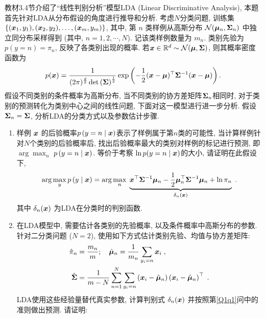 \documentclass[answers]{exam}  %
\begin{document}
\begin{questions}
  教材3.4节介绍了“线性判别分析”模型LDA (Linear Discriminative Analysis), 本题首先针对LDA从分布假设的角度进行推导和分析.
  考虑$N$分类问题, 训练集 $\left\{({\boldsymbol{x}}_1,y_1),({\boldsymbol{x}}_2,y_2),\ldots,({\boldsymbol{x}}_m,y_m)\right\}$, 其中, 第 $n$ 类样例从高斯分布 $\mathcal{N}(\boldsymbol{\mu}_n,\boldsymbol{\Sigma}_n)$ 中独立同分布采样得到 (其中, $n=1,2,\cdots,N$). 记该类样例数量为 $m_n$. 类别先验为 $p\left(y=n\right)=\pi_n$, 反映了各类别出现的概率. 若${\boldsymbol{x}}\in \mathbb{R}^d \sim \mathcal{N}(\boldsymbol{\mu},\boldsymbol{\Sigma})$, 则其概率密度函数为
  \begin{align}
    p({\boldsymbol{x}})=\frac{1}{(2\pi)^{\frac{d}{2}}\det\left(\boldsymbol{\Sigma}\right)^\frac{1}{2}}\exp\left(-\frac{1}{2}({\boldsymbol{x}}-\boldsymbol{\mu})^\top\boldsymbol{\Sigma}^{-1}({\boldsymbol{x}}-\boldsymbol{\mu})\right).
  \end{align}
  假设不同类别的条件概率为高斯分布, 当不同类别的协方差矩阵$\boldsymbol{\Sigma}_n$相同时, 对于类别的预测转化为类别中心之间的线性问题, %
  下面对这一模型进行进一步分析.
  假设$\boldsymbol{\Sigma}_n = \boldsymbol{\Sigma}$, 分析LDA的分类方式以及参数估计步骤.
  \begin{enumerate}
    \item \label{Q1q1}样例 ${\boldsymbol{x}}$ 的后验概率$p\left(y=n\mid {\boldsymbol{x}}\right)$表示了样例属于第$n$类的可能性, 当计算样例针对$N$个类别的后验概率后, 找出后验概率最大的类别对样例的标记进行预测, 即 $\arg\max_n$ $p\left(y=n\mid {\boldsymbol{x}}\right)$. 等价于考察 $\ln p(y=n\mid {\boldsymbol{x}})$的大小,  请证明在此假设下,
          \begin{equation}
            \arg\max_y p\left(y\mid {\boldsymbol{x}}\right)=\arg\max_n\; \underbrace{{\boldsymbol{x}}^{\top} \boldsymbol{\Sigma}^{-1} \boldsymbol{\mu}_{n}-\frac{1}{2} \boldsymbol{\mu}_{n}^{\top} \boldsymbol{\Sigma}^{-1} \boldsymbol{\mu}_{n}+\ln \pi_{n}}_{\delta_n({\boldsymbol{x}})}    \;.
          \end{equation}
          其中 $\delta_{n}({\boldsymbol{x}})$ 为LDA在分类时的判别函数.
    \item \label{Q1q2} 在LDA模型中, 需要估计各类别的先验概率, 以及条件概率中高斯分布的参数. 针对二分类问题 ($N=2$), 使用如下方式估计类别先验、均值与协方差矩阵:
          \begin{align}
            \hat{\pi}_{n} & =\frac{m_n}{m}; \quad
            \hat{\boldsymbol{\mu}}_{n}=\frac{1}{m_n}\sum_{y_{i}=n} {\boldsymbol{x}}_{i}\;,                                                                                       \\
            \hat{\boldsymbol{\Sigma}} & =\frac{1}{m-N}\sum_{n=1}^{N} \sum_{y_{i}=n}\left({\boldsymbol{x}}_{i}-\hat{\boldsymbol{\mu}}_{n}\right)\left({\boldsymbol{x}}_{i}-\hat{\boldsymbol{\mu}}_{n}\right)^{\top}\;.
          \end{align}
          LDA使用这些经验量替代真实参数, 计算判别式 $\delta_n({\boldsymbol{x}})$ 并按照第\ref{Q1q1}问中的准则做出预测. 请证明:

\end{enumerate}
\end{questions}
\end{document}
